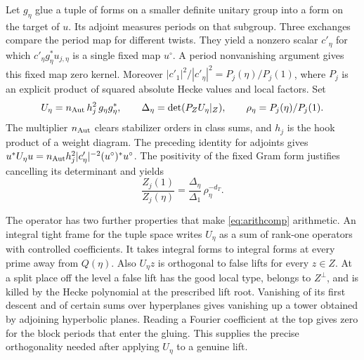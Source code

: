 Let $g_\eta$ glue a tuple of forms on a smaller definite unitary group into a form on the target of $u$. Its adjoint measures periods on that subgroup. Three exchanges compare the period map for different twists. They yield a nonzero scalar $c'_\eta$ for which $c'_\eta g_\eta^*u_{j,\eta}$ is a single fixed map $u^\circ$. A period nonvanishing argument gives this fixed map zero kernel. Moreover $|c'_1|^2/|c'_\eta|^2=P_j(\eta)/P_j(1)$, where $P_j$ is an explicit product of squared absolute Hecke values and local factors. Set
\[
 U_\eta=n_{\rm Aut}\,h_j^2\,g_\eta g_\eta^*,\qquad
 \Delta_\eta=\det(P_ZU_\eta|_Z),\qquad \rho_\eta=P_j(\eta)/P_j(1).
\]
The multiplier $n_{\rm Aut}$ clears stabilizer orders in class sums, and $h_j$ is the hook product of a weight diagram. The preceding identity for adjoints gives $u^*U_\eta u=n_{\rm Aut}h_j^2|c'_\eta|^{-2}(u^\circ)^*u^\circ$.
The positivity of the fixed Gram form justifies cancelling its determinant and yields
\begin{equation}
 \frac{Z_j(1)}{Z_j(\eta)}
       =\frac{\Delta_\eta}{\Delta_1}\,\rho_\eta^{-d_T}.
 \label{eq:arithcomp}
\end{equation}

The operator has two further properties that make \eqref{eq:arithcomp} arithmetic. An integral tight frame for the tuple space writes $U_\eta$ as a sum of rank-one operators with controlled coefficients. It takes integral forms to integral forms at every prime away from $Q(\eta)$. Also $U_\eta z$ is orthogonal to false lifts for every $z\in Z$. At a split place off the level a false lift has the good local type, belongs to $Z^\perp$, and is killed by the Hecke polynomial at the prescribed lift root. Vanishing of its first descent and of certain sums over hyperplanes gives vanishing up a tower obtained by adjoining hyperbolic planes. Reading a Fourier coefficient at the top gives zero for the block periods that enter the gluing. This supplies the precise orthogonality needed after applying $U_\eta$ to a genuine lift.

